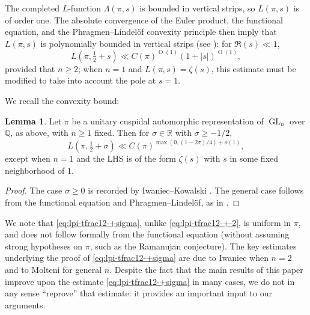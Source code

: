 \documentclass[reqno]{amsart}
\DeclareMathOperator{\GL}{GL}
\def\O{\operatorname{O}}
\theoremstyle{plain} \newtheorem{theorem} {Theorem}
\theoremstyle{definition} \newtheorem{definition} [theorem] {Definition}
\theoremstyle{itplain} %
\newtheorem{lemma}[theorem]{Lemma}
\numberwithin{equation}{section}
\numberwithin{theorem}{section}
\renewcommand{\geq}{\geqslant}
\begin{document}
The completed $L$-function $\Lambda(\pi,s)$ is bounded in vertical strips, so $L(\pi,s)$ is of order one.  The absolute convergence of the Euler product, the functional equation, and the Phragmen--Lindel\"{o}f convexity principle then imply that $L(\pi,s)$ is polynomially bounded in vertical strips (see \cite[Lemma 5.2]{MR2061214}): for $\Re(s) \ll 1$,
\begin{equation}\label{eq:lpi-tfrac12-+-2}
  L(\pi, \tfrac{1}{2} + s) \ll C(\pi)^{\O(1)} (1 + |s|)^{\O(1)},
\end{equation}
provided that $n \geq 2$; when $n = 1$ and $L(\pi,s) = \zeta(s)$, this estimate must be modified to take into account the pole at $s=1$.

We recall the convexity bound:
\begin{lemma}\label{lem:convexity-bound}
  Let $\pi$ be a unitary cuspidal automorphic representation of $\GL_n$ over $\mathbb{Q}$, as above, with $n \geq 1$ fixed.  Then for
  $\sigma \in \mathbb{R}$ with $\sigma \geq -1/2$,
  \begin{equation}\label{eq:lpi-tfrac12-+sigma}
    L(\pi, \tfrac{1}{2} +\sigma)
    \ll
    C(\pi)^{\max(0,(1 - 2 \sigma)/4) + o(1)},
  \end{equation}
  except when $n=1$ and the LHS is of the form $\zeta(s)$ with $s$ in some fixed neighborhood of $1$.
\end{lemma}
\begin{proof}
  The case $\sigma \geq 0$ is recorded by Iwaniec--Kowalski \cite[Thm 5.41]{MR2061214}.  The general case follows from the functional equation and Phragmen--Lindel\"{o}f, as in \cite[\S5, Exercise 3]{MR2061214}.
\end{proof}
\begin{remark}
  We note that \eqref{eq:lpi-tfrac12-+sigma}, unlike \eqref{eq:lpi-tfrac12-+-2}, is uniform in $\pi$, and does not follow formally from the functional equation (without assuming strong hypotheses on $\pi$, such as the Ramanujan conjecture).  The key estimates underlying the proof of \eqref{eq:lpi-tfrac12-+sigma} are due to Iwaniec \cite{MR1067982} when $n=2$ and to Molteni \cite{MR1876443} for general $n$.  Despite the fact that the main results of this paper improve upon the estimate  \eqref{eq:lpi-tfrac12-+sigma} in many cases, we do not in any sense ``reprove'' that estimate: it provides an important input to our arguments.
\end{remark}
\end{document}
